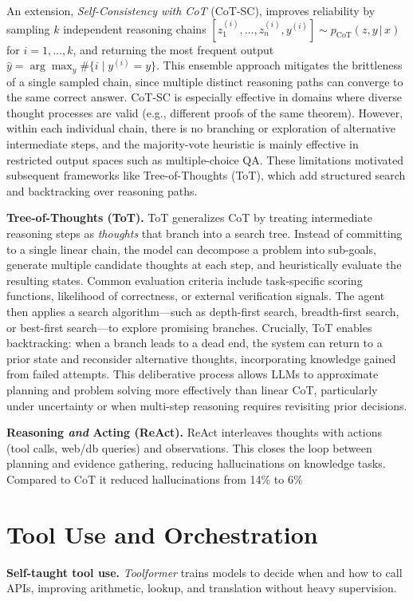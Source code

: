 An extension, \emph{Self-Consistency with CoT} (CoT-SC), improves reliability by sampling $k$ independent reasoning chains $[z^{(i)}_{1}, \dots, z^{(i)}_{n}, y^{(i)}] \sim p_{\text{CoT}}(z, y\,|\,x)$ for $i=1,\dots,k$, and returning the most frequent output $\hat{y} = \arg\max_{y}\#\{i \mid y^{(i)} = y\}$. This ensemble approach mitigates the brittleness of a single sampled chain, since multiple distinct reasoning paths can converge to the same correct answer. CoT-SC is especially effective in domains where diverse thought processes are valid (e.g., different proofs of the same theorem). However, within each individual chain, there is no branching or exploration of alternative intermediate steps, and the majority-vote heuristic is mainly effective in restricted output spaces such as multiple-choice QA. These limitations motivated subsequent frameworks like Tree-of-Thoughts (ToT), which add structured search and backtracking over reasoning paths.

\textbf{Tree-of-Thoughts (ToT).} ToT generalizes CoT by treating intermediate reasoning steps as \emph{thoughts} that branch into a search tree. Instead of committing to a single linear chain, the model can decompose a problem into sub-goals, generate multiple candidate thoughts at each step, and heuristically evaluate the resulting states. Common evaluation criteria include task-specific scoring functions, likelihood of correctness, or external verification signals. The agent then applies a search algorithm—such as depth-first search, breadth-first search, or best-first search—to explore promising branches. Crucially, ToT enables backtracking: when a branch leads to a dead end, the system can return to a prior state and reconsider alternative thoughts, incorporating knowledge gained from failed attempts. This deliberative process allows LLMs to approximate planning and problem solving more effectively than linear CoT, particularly under uncertainty or when multi-step reasoning requires revisiting prior decisions.


\textbf{Reasoning \emph{and} Acting (ReAct).} ReAct interleaves thoughts with actions (tool calls, web/db queries) and observations. This closes the loop between planning and evidence gathering, reducing hallucinations on knowledge tasks. Compared to CoT it reduced hallucinations from 14\% to 6\%

\section{Tool Use and Orchestration}
\textbf{Self-taught tool use.} \emph{Toolformer} trains models to decide when and how to call APIs, improving arithmetic, lookup, and translation without heavy supervision.

